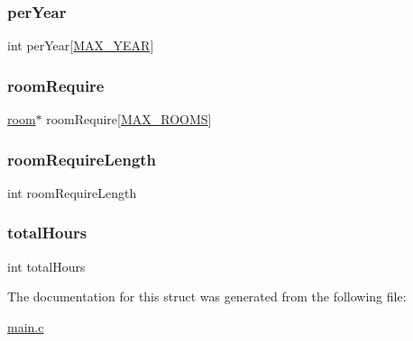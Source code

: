 \hypertarget{structsubject_a9f7950b8cf851cd516b4139193f73d43}{}\label{structsubject_a9f7950b8cf851cd516b4139193f73d43} 
\subsubsection{\texorpdfstring{per\+Year}{perYear}}
{\footnotesize\ttfamily int per\+Year\mbox{[}\hyperlink{main_8c_a59bcbb5f6896e44dfd79fa63508cfec3}{M\+A\+X\+\_\+\+Y\+E\+AR}\mbox{]}}

\hypertarget{structsubject_a5ae5b3c6b809ca65585611691557c8e5}{}\label{structsubject_a5ae5b3c6b809ca65585611691557c8e5} 
\subsubsection{\texorpdfstring{room\+Require}{roomRequire}}
{\footnotesize\ttfamily \hyperlink{structroom}{room}$\ast$ room\+Require\mbox{[}\hyperlink{main_8c_a251d94cd24a2ca3369fc3f8eca8c19ae}{M\+A\+X\+\_\+\+R\+O\+O\+MS}\mbox{]}}

\hypertarget{structsubject_afb17ea87eab6c072f053b2e6c390d873}{}\label{structsubject_afb17ea87eab6c072f053b2e6c390d873} 
\subsubsection{\texorpdfstring{room\+Require\+Length}{roomRequireLength}}
{\footnotesize\ttfamily int room\+Require\+Length}

\hypertarget{structsubject_aaa60bc5447f40a6adeacbf85c02b69e2}{}\label{structsubject_aaa60bc5447f40a6adeacbf85c02b69e2} 
\subsubsection{\texorpdfstring{total\+Hours}{totalHours}}
{\footnotesize\ttfamily int total\+Hours}



The documentation for this struct was generated from the following file\+:\begin{DoxyCompactItemize}
\item 
\hyperlink{main_8c}{main.\+c}\end{DoxyCompactItemize}
